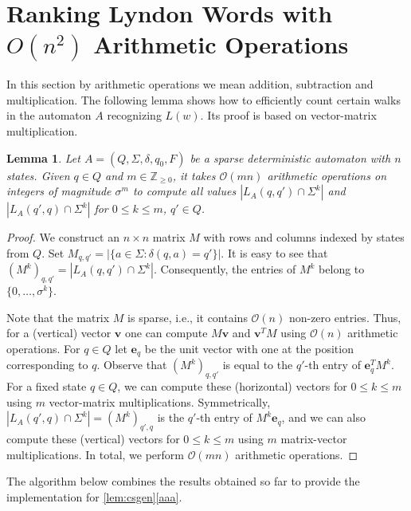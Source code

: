 \documentclass{article}
\newcommand{\mayqed}{}
\newcommand{\Oh}{\mathcal{O}}
\newtheorem{lemma}[theorem]{Lemma}
\theoremstyle{definition}
\theoremstyle{remark}
\begin{document}
\section{Ranking Lyndon Words with $O(n^2)$ Arithmetic Operations}\label{sec:arith}
In this section by arithmetic operations we mean addition, subtraction and multiplication.
The following lemma shows how to efficiently count certain walks in the automaton $A$ recognizing $L(w)$.
Its proof is based on vector-matrix multiplication.
\begin{lemma}\label{lem:mat}
  Let $A=(Q,\Sigma, \delta, q_0,F)$ be a sparse deterministic automaton with $n$ states.
  Given $q\in Q$ and  $m\in\mathbb{Z}_{\ge 0}$, it takes $\Oh(mn)$ arithmetic operations on integers of magnitude $\sigma^m$ to compute
  all values $|L_A(q,q')\cap \Sigma^k|$ and $|L_A(q',q)\cap \Sigma^k|$ for $0\le k \le m$, $q'\in Q$.
\end{lemma}
\begin{proof}
  We construct an $n\times n$ matrix $M$ with rows and columns indexed by states from $Q$.
  Set $M_{q,q'}=|\{a\in \Sigma : \delta(q,a)=q'\}|$.
  It is easy to see that $(M^k)_{q,q'}=|L_A(q,q')\cap \Sigma^k|$.
  Consequently, the entries of $M^k$ belong to $\{0,\ldots,\sigma^k\}$.
  
  Note that the matrix $M$ is sparse, i.e., it contains $\Oh(n)$ non-zero entries.
  Thus, for a (vertical) vector $\mathbf{v}$ one can compute $M\mathbf{v}$ and $\mathbf{v}^TM$ using $\Oh(n)$ 
  arithmetic operations.
  For $q\in Q$ let $\mathbf{e}_q$ be the unit vector with one at the position corresponding to $q$.
  Observe that $(M^k)_{q,q'}$ is equal to the $q'$-th entry of $\mathbf{e}_q^TM^k$.
  For a fixed state $q\in Q$, we can compute these (horizontal) vectors for $0\le k\le m$ using
  $m$ vector-matrix multiplications.
  Symmetrically, $|L_A(q',q)\cap \Sigma^k|=(M^k)_{q',q}$ is the $q'$-th entry of $M^k\mathbf{e}_{q}$,
  and we can also compute these (vertical) vectors for $0\le k\le m$ using
  $m$ matrix-vector multiplications.
  In total, we perform $\Oh(mn)$ arithmetic operations.
\mayqed\end{proof}

\noindent
The algorithm below combines the results obtained so far to provide the implementation for \cref{lem:csgen}\ref{aaa}.
\end{document}
